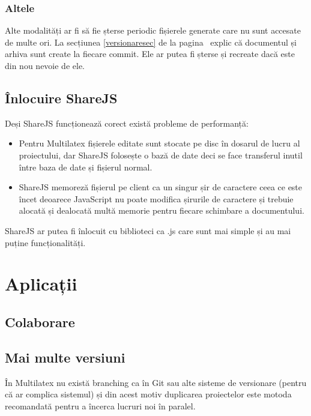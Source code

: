 \documentclass[a4wide,12pt]{report}
\newcommand{\eng}[1]{{#1}} %
\newcommand{\acr}[1]{{\textsmaller[1]{\textsc{#1}}}} %
\begin{document}
\subsection{Altele}

Alte modalități ar fi să fie șterse periodic fișierele generate care nu sunt
accesate de multe ori. La secțiunea \ref{versionaresec} de la
pagina~\pageref{versionaresec} explic că documentul \acr{PDF} și arhiva
\acr{ZIP} sunt create la fiecare \eng{commit}. Ele ar putea fi șterse și
recreate dacă este din nou nevoie de ele.

\section{Înlocuire ShareJS}

Deși ShareJS funcționează corect există probleme de performanță:

\begin{itemize}

\item Pentru Multilatex fișierele editate sunt stocate pe disc în dosarul de
lucru al proiectului, dar ShareJS folosește o bază de date deci se face
transferul inutil între baza de date și fișierul normal.

\item ShareJS memoreză fișierul pe client ca un singur șir de caractere ceea
ce este încet deoarece JavaScript nu poate modifica șirurile de caractere și
trebuie alocată și dealocată multă memorie pentru fiecare schimbare a
documentului.

\end{itemize}

ShareJS ar putea fi înlocuit cu biblioteci ca \acr{OT}.js\cite{otjs} care sunt
mai simple și au mai puține funcționalități.

\chapter{Aplicații}

\section{Colaborare}

\section{Mai multe versiuni}
\label{mulverssec}

În Multilatex nu există \eng{branching} ca în Git sau alte sisteme de versionare
(pentru că ar complica sistemul) și din acest motiv duplicarea proiectelor este
motoda recomandată pentru a încerca lucruri noi în paralel.
\end{document}

